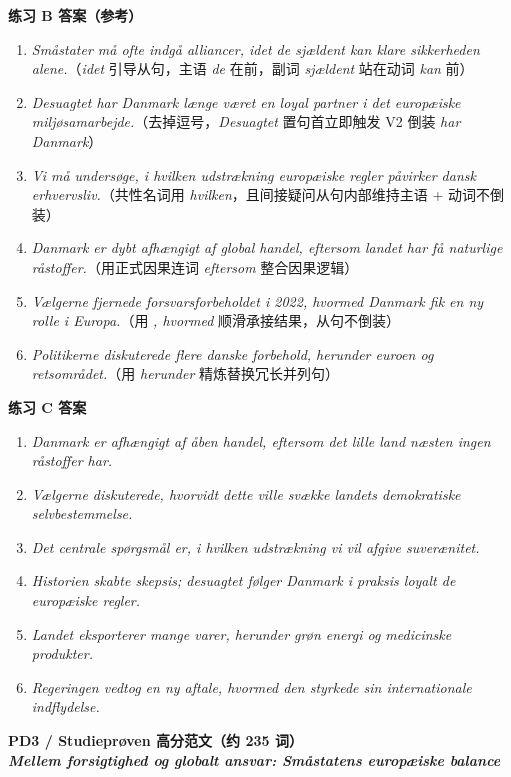 \begin{answerbox}
\textbf{练习 B 答案（参考）}
\begin{enumerate}
  \item \textit{Småstater må ofte indgå alliancer, idet de sjældent kan klare sikkerheden alene.}（\textit{idet} 引导从句，主语 \textit{de} 在前，副词 \textit{sjældent} 站在动词 \textit{kan} 前）
  \item \textit{Desuagtet har Danmark længe været en loyal partner i det europæiske miljøsamarbejde.}（去掉逗号，\textit{Desuagtet} 置句首立即触发 V2 倒装 \textit{har Danmark}）
  \item \textit{Vi må undersøge, i hvilken udstrækning europæiske regler påvirker dansk erhvervsliv.}（共性名词用 \textit{hvilken}，且间接疑问从句内部维持主语 + 动词不倒装）
  \item \textit{Danmark er dybt afhængigt af global handel, eftersom landet har få naturlige råstoffer.}（用正式因果连词 \textit{eftersom} 整合因果逻辑）
  \item \textit{Vælgerne fjernede forsvarsforbeholdet i 2022, hvormed Danmark fik en ny rolle i Europa.}（用 \textit{, hvormed} 顺滑承接结果，从句不倒装）
  \item \textit{Politikerne diskuterede flere danske forbehold, herunder euroen og retsområdet.}（用 \textit{herunder} 精炼替换冗长并列句）
\end{enumerate}

\textbf{练习 C 答案}
\begin{enumerate}
  \item \textit{Danmark er afhængigt af åben handel, eftersom det lille land næsten ingen råstoffer har.}
  \item \textit{Vælgerne diskuterede, hvorvidt dette ville svække landets demokratiske selvbestemmelse.}
  \item \textit{Det centrale spørgsmål er, i hvilken udstrækning vi vil afgive suverænitet.}
  \item \textit{Historien skabte skepsis; desuagtet følger Danmark i praksis loyalt de europæiske regler.}
  \item \textit{Landet eksporterer mange varer, herunder grøn energi og medicinske produkter.}
  \item \textit{Regeringen vedtog en ny aftale, hvormed den styrkede sin internationale indflydelse.}
\end{enumerate}

\textbf{PD3 / Studieprøven 高分范文（约 235 词）}\\
\textit{\textbf{Mellem forsigtighed og globalt ansvar: Småstatens europæiske balance}}


\end{answerbox}
